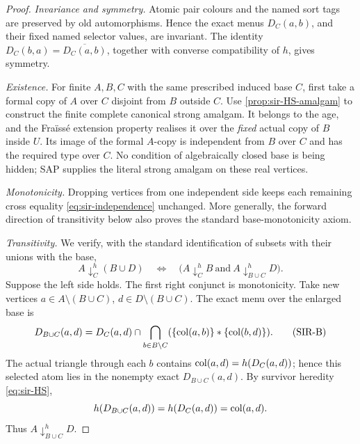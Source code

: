 \begin{proof}
\emph{Invariance and symmetry.}
Atomic pair colours and the named
sort tags are preserved by old
automorphisms. Hence the exact
menus \(D_C(a,b)\), and their
fixed named selector values, are
invariant. The identity
\(D_C(b,a)=\overline{D_C(a,b)}\),
together with converse compatibility
of \(h\), gives symmetry.

\emph{Existence.}
For finite \(A,B,C\) with the
same prescribed induced base
\(C\), first take a formal
copy of \(A\) over \(C\) disjoint
from \(B\) outside \(C\).
Use \cref{prop:sir-HS-amalgam}
to construct the finite
complete canonical strong amalgam.
It belongs to the age, and the
Fra\"iss\'e extension property
realises it over the
\emph{fixed} actual copy of \(B\)
inside \(U\). Its image of the
formal \(A\)-copy is independent
from \(B\) over \(C\) and has
the required type over \(C\).
No condition of algebraically
closed base is being hidden;
SAP supplies the literal strong
amalgam on these real vertices.

\emph{Monotonicity.}
Dropping vertices from one
independent side keeps each
remaining cross equality
\eqref{eq:sir-independence}
unchanged. More generally,
the forward direction of
transitivity below also proves
the standard base-monotonicity
axiom.

\emph{Transitivity.}
We verify, with the standard
identification of subsets with
their unions with the base,
\[
 A\downarrow_C^h(B\cup D)
 \quad\Longleftrightarrow\quad
 \bigl(A\downarrow_C^h B
       \ \text{and}\
       A\downarrow_{B\cup C}^h D\bigr).
 \tag{SIR-T}\label{eq:sir-transitivity}
\]
Suppose the left side holds.
The first right conjunct is
monotonicity. Take new vertices
\(a\in A\setminus(B\cup C)\),
\(d\in D\setminus(B\cup C)\).
The exact menu over the enlarged
base is
\[
 D_{B\cup C}(a,d)=
 D_C(a,d)\cap
 \bigcap_{b\in B\setminus C}
 (\{\operatorname{col}(a,b)\}*\{\operatorname{col}(b,d)\}).
 \tag{SIR-B}\label{eq:sir-base-extension}
\]
The actual triangle through
each \(b\) contains
\(\operatorname{col}(a,d)=h(D_C(a,d))\);
hence this selected atom lies
in the nonempty exact
\(D_{B\cup C}(a,d)\).
By survivor heredity
\eqref{eq:sir-HS},
\[
 h(D_{B\cup C}(a,d))
       =h(D_C(a,d))=\operatorname{col}(a,d).
\]
Thus \(A\downarrow_{B\cup C}^h D\).


\end{proof}
